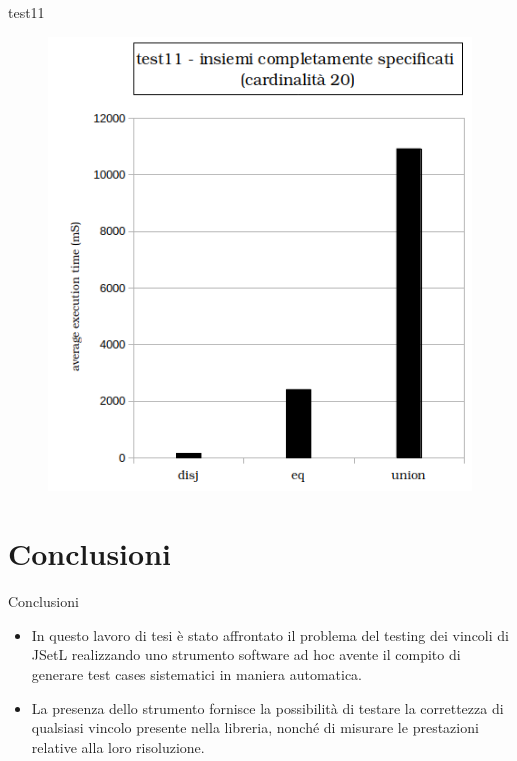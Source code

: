 \documentclass{beamer}
\begin{document}
\begin{frame}{test11}
	\begin{figure}

	\includegraphics[scale=0.5]{histogram_test11.png}
	
	\end{figure}
\end{frame}

\section{Conclusioni}
\begin{frame}{Conclusioni}
\begin{block}{}
\begin{itemize}
\setlength\itemsep{2em}
\item In questo lavoro di tesi \`e stato affrontato il problema del testing dei vincoli di JSetL realizzando uno strumento software ad hoc avente il compito di generare test cases sistematici in maniera automatica.%
\item La presenza dello strumento fornisce la possibilit\`a di testare la correttezza di qualsiasi vincolo presente nella libreria, nonch\'e di misurare le prestazioni relative alla loro risoluzione.
\end{itemize}
\end{block}
\end{frame}
\end{document}
